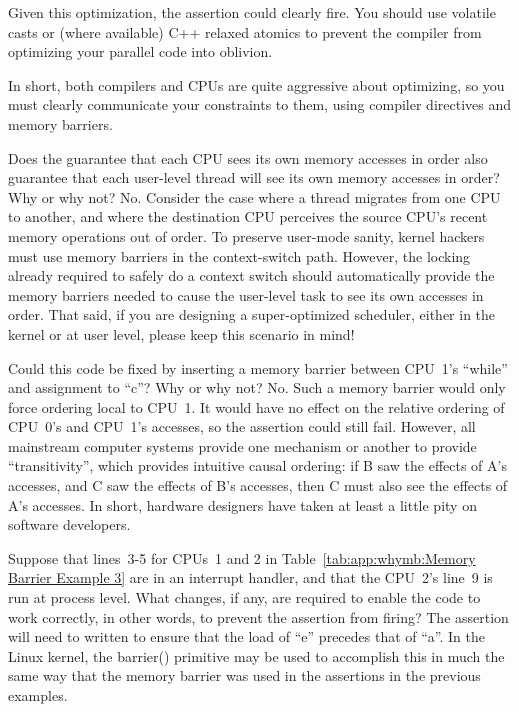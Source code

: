\begin{enumerate}
	Given this optimization, the assertion could clearly fire.
	You should use volatile casts or (where available) C++
	relaxed atomics to prevent the compiler from optimizing
	your parallel code into oblivion.

	In short, both compilers and CPUs are quite aggressive about
	optimizing, so you must clearly communicate your constraints
	to them, using compiler directives and memory barriers.


\QuickQ{}
	Does the guarantee that each CPU sees its own memory accesses
	in order also guarantee that each user-level thread will see
	its own memory accesses in order?
	Why or why not?
\QuickA{}
	No.  Consider the case where a thread migrates from one CPU to
	another, and where the destination CPU perceives the source
	CPU's recent memory operations out of order.  To preserve
	user-mode sanity, kernel hackers must use memory barriers in
	the context-switch path.  However, the locking already required
	to safely do a context switch should automatically provide
	the memory barriers needed to cause the user-level task to see
	its own accesses in order.  That said, if you are designing a
	super-optimized scheduler, either in the kernel or at user level,
	please keep this scenario in mind!

\QuickQ{}
	Could this code be fixed by inserting a memory barrier
	between CPU~1's ``while'' and assignment to ``c''?
	Why or why not?
\QuickA{}
	No.  Such a memory barrier would only force ordering local to CPU~1.
	It would have no effect on the relative ordering of CPU~0's and
	CPU~1's accesses, so the assertion could still fail.
	However, all mainstream computer systems provide one mechanism
	or another to provide ``transitivity'', which provides
	intuitive causal ordering: if B saw the effects of A's accesses,
	and C saw the effects of B's accesses, then C must also see
	the effects of A's accesses.
	In short, hardware designers have taken at least a little pity
	on software developers.

\QuickQ{}
	Suppose that lines~3-5 for CPUs~1 and 2 in
	Table~\ref{tab:app:whymb:Memory Barrier Example 3}
	are in an interrupt
	handler, and that the CPU~2's line~9 is run at process level.
	What changes, if any, are required to enable the code to work
	correctly, in other words, to prevent the assertion from firing?
\QuickA{}
	The assertion will need to written to ensure that the load of
	``e'' precedes that of ``a''.
	In the Linux kernel, the barrier() primitive may be used to accomplish
	this in much the same way that the memory barrier was used in the
	assertions in the previous examples.


\end{enumerate}
